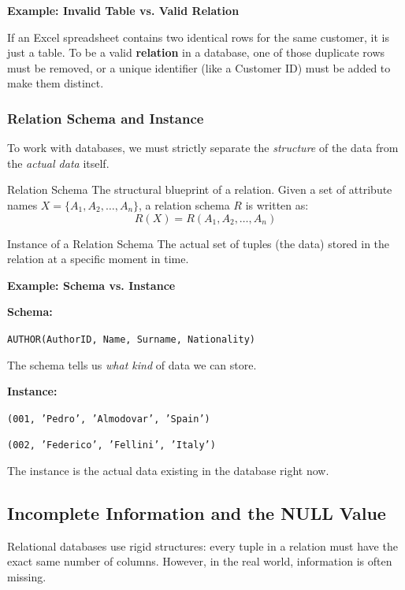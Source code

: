 \vspace{0.2cm}
\begin{example}{\textbf{Example: Invalid Table vs. Valid Relation}}

If an Excel spreadsheet contains two identical rows for the same customer, it is just a table. To be a valid \textbf{relation} in a database, one of those duplicate rows must be removed, or a unique identifier (like a Customer ID) must be added to make them distinct.
\end{example}

\subsubsection{Relation Schema and Instance}
To work with databases, we must strictly separate the \textit{structure} of the data from the \textit{actual data} itself.

\begin{defbox}{Relation Schema}
The structural blueprint of a relation. Given a set of attribute names $X = \{A_1, A_2, \dots, A_n\}$, a relation schema $R$ is written as:
$$R(X) = R(A_1, A_2, \dots, A_n)$$
\end{defbox}

\begin{defbox}{Instance of a Relation Schema}
The actual set of tuples (the data) stored in the relation at a specific moment in time. 
\end{defbox}
\pagebreak

\begin{example}{\textbf{Example: Schema vs. Instance}}

\textbf{Schema:} 

\texttt{AUTHOR(AuthorID, Name, Surname, Nationality)}

The schema tells us \textit{what kind} of data we can store. 

\textbf{Instance:} 

\texttt{(001, 'Pedro', 'Almodovar', 'Spain')} 

\texttt{(002, 'Federico', 'Fellini', 'Italy')}

The instance is the actual data existing in the database right now.
\end{example}

\subsection{Incomplete Information and the NULL Value}
Relational databases use rigid structures: every tuple in a relation must have the exact same number of columns. However, in the real world, information is often missing. 

